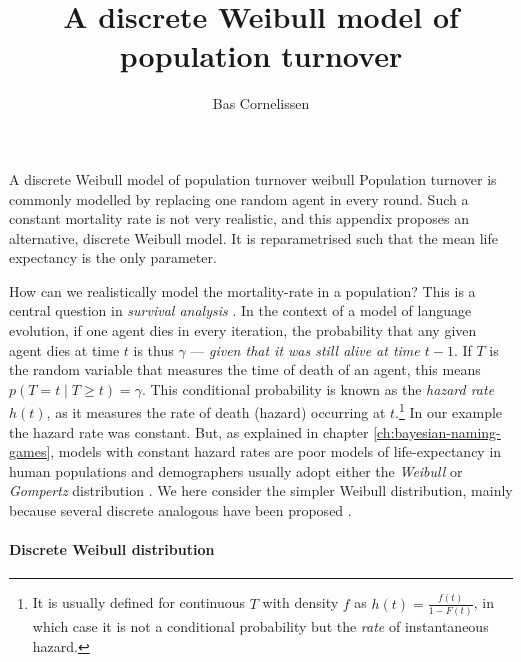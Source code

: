 \documentclass{../src/bcthesispart}
\title{A discrete Weibull model of population turnover}
\author{Bas Cornelissen}
\begin{document}

%
	{A discrete Weibull model of population turnover}%
	{weibull}{%
	Population turnover is commonly modelled by replacing one random agent in every round. 
	Such a constant mortality rate is not very realistic, and this appendix proposes an alternative, discrete Weibull model.
	It is reparametrised such that the mean life expectancy is the only parameter.
}





\noindent
How can we realistically model the mortality-rate in a population?
This is a central question in \emph{survival analysis} \parencite[e.g.][]{Rodriguez2007}.
In the context of a model of language evolution, if one agent dies in every iteration, the probability that any given agent dies at time $t$ is thus $\gamma$ — \emph{given that it was still alive at time $t-1$}.
If $T$ is the random variable that measures the time of death of an agent, this means $p(T = t \mid T \ge t) = \gamma$.
This conditional probability is known as the \emph{hazard rate} $h(t)$, as it measures the rate of death (hazard) occurring at $t$.\footnote{%
	It is usually defined for continuous $T$ with density $f$ as $h(t) = \frac{f(t)}{1-F(t)}$, in which case it is not a conditional probability but the \emph{rate} of instantaneous hazard.
	}
In our example the hazard rate was constant.
But, as explained in chapter \ref{ch:bayesian-naming-games}, models with constant hazard rates are poor models of life-expectancy in human populations and demographers usually adopt either the \emph{Weibull} or \emph{Gompertz} distribution \parencite{Juckett1993}.
We here consider the simpler Weibull distribution, mainly because several discrete analogous have been proposed \parencite{Nakagawa1975,Stein1984,Almalki2014}.




\paragraph{Discrete Weibull distribution} 
\end{document}

